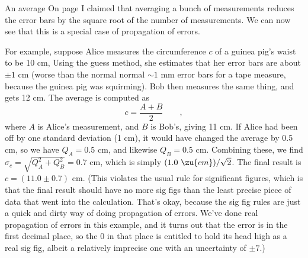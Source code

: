 \begin{eg}{An average}\label{eg:average}
On page \pageref{precision-of-average} I claimed that averaging a bunch of measurements 
reduces the error bars by the square root of the number of measurements. We can now see that
this is a special case of propagation of errors.

For example, suppose Alice measures the circumference $c$ of a guinea pig's waist to be 10 cm,
Using the guess method, she estimates that her error
bars are about $\pm 1$ cm (worse than the normal normal $\sim 1$ mm error bars for a tape measure, because the guinea
pig was squirming). 
Bob then measures the same thing, and gets 12 cm. The average is computed as
\begin{equation*}
  c = \frac{A+B}{2} \qquad ,
\end{equation*}
where $A$ is Alice's measurement, and $B$ is Bob's, giving 11 cm. If Alice had been off by one
standard deviation (1 cm), it would have changed the average by 0.5 cm, so we have $Q_A=0.5$ cm, and
likewise $Q_B=0.5$ cm. Combining these, we find $\sigma_c=\sqrt{Q_A^2+Q_B^2}=0.7$ cm, which is
simply $(1.0\ \zu{cm})/\sqrt{2}$. The final result is $c=(11.0\pm0.7)$ cm. (This violates the usual
rule for significant figures, which is that the final result should have no more sig figs than the
least precise piece of data that went into the calculation. That's okay, because the sig fig rules
are just a quick and dirty way of doing propagation of errors. We've done real propagation of errors
in this example, and it turns out that the error is in the first decimal place,
so the 0 in that place is entitled to hold its head high as a real sig fig, albeit a relatively
imprecise one with an uncertainty of $\pm7$.)
\end{eg}

